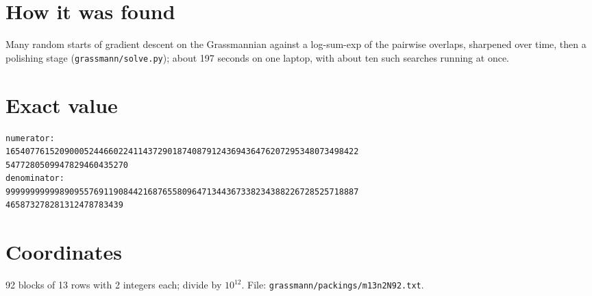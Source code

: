 \documentclass[11pt,a4paper]{article}
\begin{document}
\section{How it was found}
Many random starts of gradient descent on the Grassmannian against a log-sum-exp of the pairwise overlaps, sharpened over time, then a polishing stage (\texttt{grassmann/solve.py}); about 197 seconds on one laptop, with about ten such searches running at once.


\appendix
\section{Exact value}
{\small
\begin{verbatim}
numerator:
165407761520900052446602241143729018740879124369436476207295348073498422
5477280509947829460435270
denominator:
999999999998909557691190844216876558096471344367338234388226728525718887
465873278281312478783439
\end{verbatim}}

\section{Coordinates}
92 blocks of 13 rows with 2 integers each; divide by $10^{12}$. File: \texttt{grassmann/packings/m13n2N92.txt}.
{\tiny
\begin{multicols}{4}
\end{multicols}}
\end{document}
